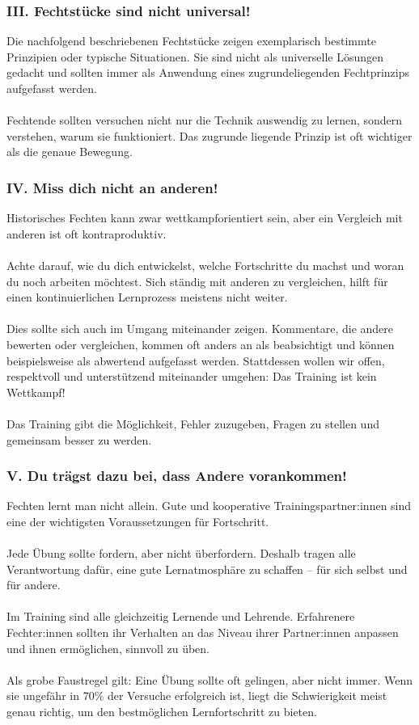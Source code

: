\subsubsection*{III. Fechtstücke sind nicht universal!}

Die nachfolgend beschriebenen Fechtstücke zeigen exemplarisch bestimmte Prinzipien oder typische Situationen.
Sie sind nicht als universelle Lösungen gedacht und sollten immer als Anwendung eines zugrundeliegenden Fechtprinzips aufgefasst werden.
\\
\\
Fechtende sollten versuchen nicht nur die Technik auswendig zu lernen, sondern verstehen, warum sie funktioniert.
Das zugrunde liegende Prinzip ist oft wichtiger als die genaue Bewegung.

\subsubsection*{IV. Miss dich nicht an anderen!}

Historisches Fechten kann zwar wettkampforientiert sein, aber ein Vergleich mit anderen ist oft kontraproduktiv.
\\
\\
Achte darauf, wie du dich entwickelst, welche Fortschritte du machst und woran du noch arbeiten möchtest.
Sich ständig mit anderen zu vergleichen, hilft für einen kontinuierlichen Lernprozess meistens nicht weiter.
\\
\\
Dies sollte sich auch im Umgang miteinander zeigen.
Kommentare, die andere bewerten oder vergleichen, kommen oft anders an als beabsichtigt und können beispielsweise als abwertend aufgefasst werden.
Stattdessen wollen wir offen, respektvoll und unterstützend miteinander umgehen: Das Training ist kein Wettkampf!
\\
\\
Das Training gibt die Möglichkeit, Fehler zuzugeben, Fragen zu stellen und gemeinsam besser zu werden.

\subsubsection*{V. Du trägst dazu bei, dass Andere vorankommen!}

Fechten lernt man nicht allein.
Gute und kooperative Trainingspartner:innen sind eine der wichtigsten Voraussetzungen für Fortschritt.
\\
\\
Jede Übung sollte fordern, aber nicht überfordern.
Deshalb tragen alle Verantwortung dafür, eine gute Lernatmosphäre zu schaffen – für sich selbst und für andere.
\\
\\
Im Training sind alle gleichzeitig Lernende und Lehrende.
Erfahrenere Fechter:innen sollten ihr Verhalten an das Niveau ihrer Partner:innen anpassen und ihnen ermöglichen, sinnvoll zu üben.
\\
\\
Als grobe Faustregel gilt: Eine Übung sollte oft gelingen, aber nicht immer.
Wenn sie ungefähr in 70\% der Versuche erfolgreich ist, liegt die Schwierigkeit meist genau richtig, um den bestmöglichen Lernfortschritt zu bieten.

